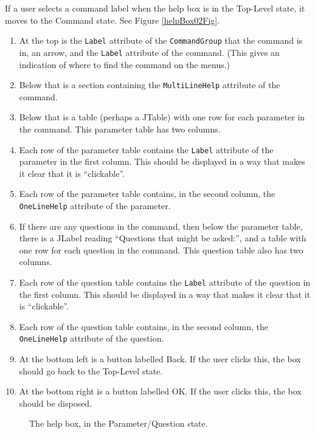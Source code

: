 \documentclass[11pt]{article}
\begin{document}
If a user selects a command label when the help box is in the
Top-Level state, it moves to the Command state.
See Figure \ref{helpBox02Fig}.
\begin{enumerate}
\item At the top is the {\tt Label} attribute of the {\tt CommandGroup}
  that the command is in, an arrow, and the {\tt Label} attribute of the
  command.  (This gives an indication of where to find the command
  on the menus.)
\item Below that is a section containing the {\tt MultiLineHelp} attribute
  of the command.
\item Below that is a table (perhaps a JTable) with one row for each
  parameter in the command.  This parameter table has two columns.
\item Each row of the parameter table contains the {\tt Label} attribute of
  the parameter in the first column.  This should be displayed in a
  way that makes it clear that it is ``clickable''.
\item Each row of the parameter table contains, in the second column, the
  {\tt OneLineHelp} attribute of the parameter.
\item If there are any questions in the command, then below the parameter
  table, there is a JLabel reading ``Questions that might be asked:'',
  and a table with one row for each question in the command.
  This question table also has two columns.
\item Each row of the question table contains the {\tt Label} attribute of
  the question in the first column.  This should be displayed in a
  way that makes it clear that it is ``clickable''.
\item Each row of the question table contains, in the second column, the
  {\tt OneLineHelp} attribute of the question.
\item At the bottom left is a button labelled Back.  If the user
  clicks this, the box should go back to the Top-Level state.
\item At the bottom right is a button labelled OK.  If the user
  clicks this, the box should be disposed.
\end{enumerate}

\begin{figure}

\centerline{\epsfxsize=4in }

\caption{
  The help box, in the Parameter/Question state.
}
\label{helpBox03Fig}
\end{figure}
\end{document}
